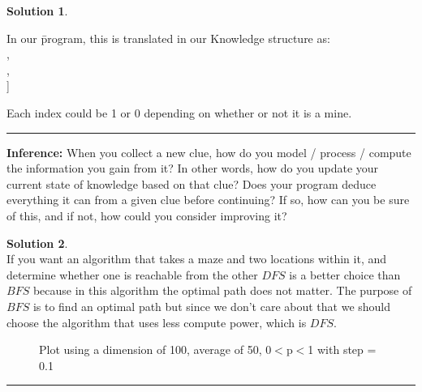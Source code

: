 \documentclass{article}
\theoremstyle{definition}
\def\fline{\rule{0.75\linewidth}{0.5pt}}
\newcommand{\finishline}{\vspace{-15pt}\begin{center}\fline\end{center}}
\newtheorem*{solution*}{Solution}
\newenvironment{solution}{\begin{solution*}}{{\finishline} \end{solution*}}
\begin{document}
\begin{solution}
\begin{tabbing}
	In our \=program, this is translated in our Knowledge structure as: \\
	\> [ \=[ \{ (0,1),(1,0),(1,1) \} ,1], \\
	    \>\>[ \{ (0,1),(1,1),(1,2) \} ,2], \\
	    \>\>[ \{ (2,0),(1,0),(1,1),(1,2),(2,2) \} ,3] ]
	\end{tabbing}
	Each index could be 1 or 0 depending on whether or not it is a mine.
\end{solution}
\smallskip

\textbf{Inference:}
	When you collect a new clue, how do you model / process / compute the information you gain from it?
 In other words, how do you update your current state of knowledge based on that clue? 
Does your program deduce everything it can from a given clue before continuing? If so, how can you be sure of this, and if not, how could you consider improving it? 

	

\smallskip

\begin{solution} \hfill \\
	If you want an algorithm that takes a maze and two locations within it, and determine whether one is reachable from the other $DFS$ is a better choice than $BFS$ because in this algorithm the optimal path does not matter. The purpose of $BFS$ is to find an optimal path but since we don't care about that we should choose the algorithm that uses less compute power, which is $DFS$.
	
	\begin{figure}[h]
	\centering
	\caption{Plot using a dimension of 100, average of 50, 0$<$p$<$1 with step = 0.1}
	\end{figure}
	
\end{solution}
\end{document}

